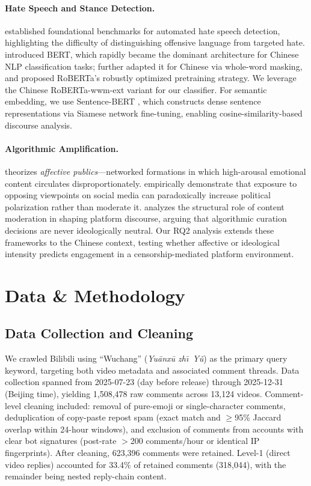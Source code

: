 \documentclass[letterpaper]{article}
\begin{document}
\paragraph{Hate Speech and Stance Detection.}
\citet{davidson2017hate} established foundational benchmarks for automated hate speech detection, highlighting the difficulty of distinguishing offensive language from targeted hate. \citet{devlin2019bert} introduced BERT, which rapidly became the dominant architecture for Chinese NLP classification tasks; \citet{cui2020macbert} further adapted it for Chinese via whole-word masking, and \citet{liu2019roberta} proposed RoBERTa's robustly optimized pretraining strategy. We leverage the Chinese RoBERTa-wwm-ext variant for our classifier. For semantic embedding, we use Sentence-BERT \citep{reimers2019sbert}, which constructs dense sentence representations via Siamese network fine-tuning, enabling cosine-similarity-based discourse analysis.

\paragraph{Algorithmic Amplification.}
\citet{papacharissi2015} theorizes \textit{affective publics}---networked formations in which high-arousal emotional content circulates disproportionately. \citet{bail2018} empirically demonstrate that exposure to opposing viewpoints on social media can paradoxically increase political polarization rather than moderate it. \citet{gillespie2018} analyzes the structural role of content moderation in shaping platform discourse, arguing that algorithmic curation decisions are never ideologically neutral. Our RQ2 analysis extends these frameworks to the Chinese context, testing whether affective or ideological intensity predicts engagement in a censorship-mediated platform environment.

\section{Data \& Methodology}

\subsection{Data Collection and Cleaning}
We crawled Bilibili using ``Wuchang'' (\textit{Yu\={a}nx\={u} zh\=\i\ Y\v{u}}) as the primary query keyword, targeting both video metadata and associated comment threads. Data collection spanned from 2025-07-23 (day before release) through 2025-12-31 (Beijing time), yielding 1,508,478 raw comments across 13,124 videos. Comment-level cleaning included: removal of pure-emoji or single-character comments, deduplication of copy-paste repost spam (exact match and $\geq$95\% Jaccard overlap within 24-hour windows), and exclusion of comments from accounts with clear bot signatures (post-rate $>$200 comments/hour or identical IP fingerprints). After cleaning, 623,396 comments were retained. Level-1 (direct video replies) accounted for 33.4\% of retained comments (318,044), with the remainder being nested reply-chain content.
\end{document}
